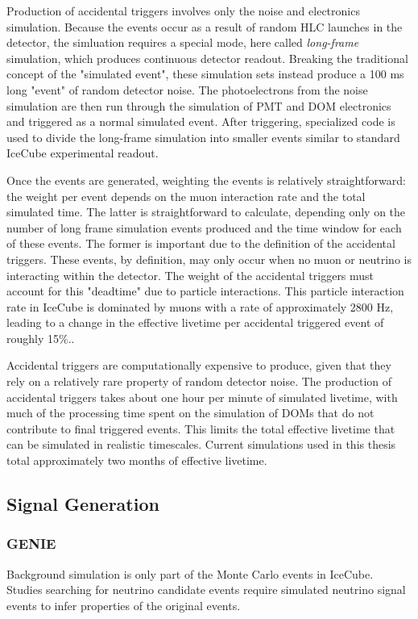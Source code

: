 Production of accidental triggers involves only the noise and electronics simulation.
Because the events occur as a result of random HLC launches in the detector, the simluation requires a special mode, here called \emph{long-frame} simulation, which produces continuous detector readout. 
Breaking the traditional concept of the "simulated event", these simulation sets instead produce a 100 ms long "event" of random detector noise. 
The photoelectrons from the noise simulation are then run through the simulation of PMT and DOM electronics and triggered as a normal simulated event.
After triggering, specialized code is used to divide the long-frame simulation into smaller events similar to standard IceCube experimental readout.

Once the events are generated, weighting the events is relatively straightforward: the weight per event depends on the muon interaction rate and the total simulated time.
The latter is straightforward to calculate, depending only on the number of long frame simulation events produced and the time window for each of these events.
The former is important due to the definition of the accidental triggers. 
These events, by definition, may only occur when no muon or neutrino is interacting within the detector. 
The weight of the accidental triggers must account for this "deadtime" due to particle interactions.
This particle interaction rate in IceCube is dominated by muons with a rate of approximately 2800 Hz, leading to a change in the effective livetime per accidental triggered event of roughly 15\%..

Accidental triggers are computationally expensive to produce, given that they rely on a relatively rare property of random detector noise. 
The production of accidental triggers takes about one hour per minute of simulated livetime, with much of the processing time spent on the simulation of DOMs that do not contribute to final triggered events.
This limits the total effective livetime that can be simulated in realistic timescales.
Current simulations used in this thesis total approximately two months of effective livetime.

\subsection{Signal Generation}
\label{subsec:signal_generation}

\subsubsection{GENIE}
\label{subsubsec:genie}
Background simulation is only part of the Monte Carlo events in IceCube. 
Studies searching for neutrino candidate events require simulated neutrino signal events to infer properties of the original events.

